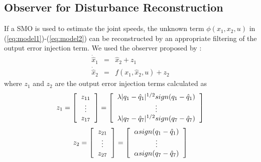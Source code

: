 \documentclass[conference,letterpaper]{ieeeconf}
\begin{document}
\subsection{Observer for Disturbance Reconstruction}
If a SMO is used to estimate the joint speeds, the unknown term $\phi(x_1, x_2, u)$ in (\ref{eq:model1})-(\ref{eq:model2}) can be reconstructed by an appropriate filtering of the output error injection term. We used the observer proposed by \cite{shtessel2014sliding}:
  \begin{eqnarray}
    \dot{\hat{x}}_1 &=& \hat{x}_2 + z_1\label{eq:observer1}\\
    \dot{\hat{x}}_2 &=& f(x_1, \hat{x}_2, u) + z_2\label{eq:observer2}
  \end{eqnarray}
  where $z_1$ and $z_2$ are the output error injection terms calculated as
  \begin{equation*}z_1 =
    \left[\begin{tabular}{c}
        $z_{11}$\\
        $\vdots$\\
        $z_{17}$
    \end{tabular}\right] = 
    \left[\begin{tabular}{c}
        $\lambda\vert q_1 - \hat{q}_1\vert ^{1/2}sign(q_1 - \hat{q}_1)$ \\
        $\vdots$\\
        $\lambda\vert q_7 - \hat{q}_7\vert ^{1/2}sign(q_7 - \hat{q}_7)$
    \end{tabular}\right]
\end{equation*}
\begin{equation*}z_2 =
  \left[\begin{tabular}{c}
      $z_{21}$\\
      $\vdots$\\
      $z_{27}$
    \end{tabular}\right] = 
  \left[\begin{tabular}{c}
      $\alpha sign(q_1 - \hat{q}_1)$ \\
      $\vdots$\\
      $\alpha sign(q_7 - \hat{q}_7)$
    \end{tabular}\right]
\end{equation*}
\end{document}
